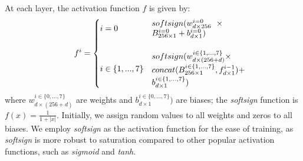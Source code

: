 At each layer, the activation function $f$ is given by:
\begin{align} 
\label{equ:ilayer} 
f^{i}=
\begin{cases}
i = 0&\parbox{.25\textwidth}{$softsign(w^{i=0}_{d\times 256}\times B^{i=0}_{256 \times 1}+b^{i=0}_{d\times1})$} \\
\\
i\in\{1,...,7\}&\parbox{.28\textwidth}{$softsign(w^{i\in \{1,...,7\}}_{d\times (256+d)} \times concat(B^{i\in \{1,...,7\}}_{256 \times 1}, 
	f^{i-1}_{d\times 1})+b^{i\in \{1,...,7\}}_{d\times1})$ } 
\end{cases}
\end{align}
where $w^{i\in \{0,...,7\}}_{d\times (256+d)}$ are weights and $b^{i\in \{0,...,7\}}_{d\times1})$ are biases; the \emph{softsign} function is $f(x) = \frac{1}{1+|x|}$. Initially, we assign random values to all weights and zeros to all biases. We employ \emph{softsign} as the activation function for the ease of training, as \emph{softsign} is more robust to saturation compared to other popular activation functions, such as \emph{sigmoid} and \emph{tanh}. %

